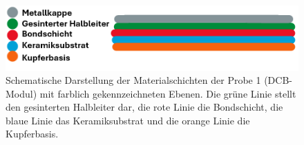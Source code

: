 \begin{figure}[htbp]
    \centering
    \includegraphics[scale=0.75]{Bilder/probelinie1}
    \caption{Schematische Darstellung der Materialschichten der Probe 1 (DCB-Modul) mit farblich gekennzeichneten Ebenen. Die grüne Linie stellt den gesinterten Halbleiter dar, die rote Linie die Bondschicht, die blaue Linie das Keramiksubstrat und die orange Linie die Kupferbasis.}
    \label{Abbildung 7 :Schematische Darstellung der Materialschichten der Probe 1 (DCB-Modul) mit farblich gekennzeichneten Ebenen. Die grüne Linie stellt den gesinterten Halbleiter dar, die rote Linie die Bondschicht, die blaue Linie das Keramiksubstrat und die orange Linie die Kupferbasis.}
\end{figure}
\vspace{0.5cm}

